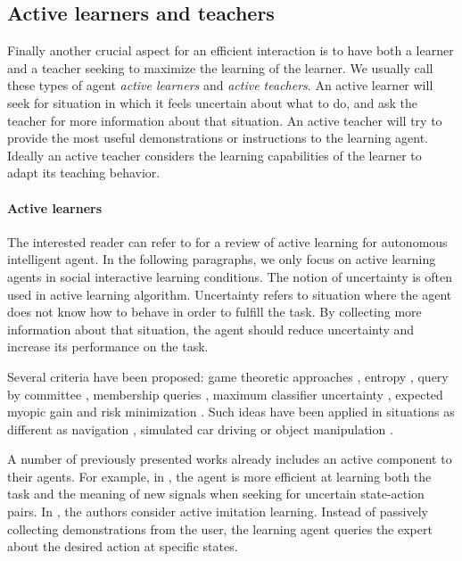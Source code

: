 \subsection{Active learners and teachers}

Finally another crucial aspect for an efficient interaction is to have both a learner and a teacher seeking to maximize the learning of the learner. We usually call these types of agent \emph{active learners} and \emph{active teachers}. An active learner will seek for situation in which it feels uncertain about what to do, and ask the teacher for more information about that situation. An active teacher will try to provide the most useful demonstrations or instructions to the learning agent. Ideally an active teacher considers the learning capabilities of the learner to adapt its teaching behavior. 

\paragraph{Active learners} 

The interested reader can refer to \cite{lopes2014active} for a review of active learning for autonomous intelligent agent. In the following paragraphs, we only focus on active learning agents in social interactive learning conditions. The notion of uncertainty is often used in active learning algorithm. Uncertainty refers to situation where the agent does not know how to behave in order to fulfill the task. By collecting more information about that situation, the agent should reduce uncertainty and increase its performance on the task.


Several criteria have been proposed: game theoretic approaches \cite{shon2007active}, entropy \cite{macl09airl,melo2010learning}, query by committee \cite{judah2012active}, membership queries \cite{melo2013multi}, maximum classifier uncertainty \cite{chernova09jair}, expected myopic gain \cite{cohn2010selecting,cohn2011comparing} and risk minimization \cite{doshi2008reinforcement}. Such ideas have been applied in situations as different as navigation \cite{macl09airl,cohn2010selecting,cohn2011comparing}, simulated car driving \cite{chernova09jair} or object manipulation \cite{macl09airl}.

A number of previously presented works already includes an active component to their agents. For example, in \cite{macl11simul}, the agent is more efficient at learning both the task and the meaning of new signals when seeking for uncertain state-action pairs. In \cite{judah2012active}, the authors consider active imitation learning. Instead of passively collecting demonstrations from the user, the learning agent queries the expert about the desired action at specific states.

